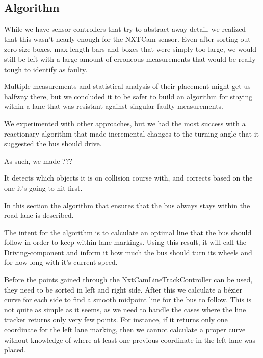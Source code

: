 \subsection{Algorithm}

While we have sensor controllers that try to abstract away detail, we realized that this wasn't nearly enough for the NXTCam sensor. Even after sorting out zero-size boxes, max-length bars and boxes that were simply too large, we would still be left with a large amount of erroneous measurements that would be really tough to identify as faulty.

Multiple measurements and statistical analysis of their placement might get us halfway there, but we concluded it to be safer to build an algorithm for staying within a lane that was resistant against singular faulty measurements.

We experimented with other approaches, but we had the most success with a reactionary algorithm that made incremental changes to the turning angle that it suggested the bus should drive. 

As such, we made ???


It detects which objects it is on collision course with, and corrects based on the one it's going to hit first. 







In this section the algorithm that ensures that the bus always stays within the road lane is described. 

The intent for the algorithm is to calculate an optimal line that the bus should follow in order to keep within lane markings. Using this result, it will call the Driving-component and inform it how much the bus should turn its wheels and for how long with it's current speed. 

Before the points gained through the NxtCamLineTrackController can be used, they need to be sorted in left and right side. After this we calculate a bézier curve for each side to find a smooth midpoint line for the bus to follow. This is not quite as simple as it seems, as we need to handle the cases where the line tracker returns only very few points. For instance, if it returns only one coordinate for the left lane marking, then we cannot calculate a proper curve without knowledge of where at least one previous coordinate in the left lane was placed. 

